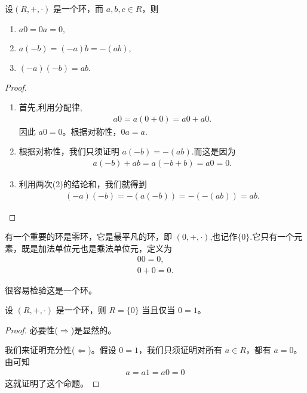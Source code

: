 \documentclass[../../main.tex]{subfiles}
\begin{document}
\begin{proposition}\label{proposition:环的加法单位元和乘法逆元的性质}
设$(R, +, \cdot)$ 是一个环，而 $a,b,c\in R$，则
\begin{enumerate}[(1)]
\item $a0 = 0a = 0,$

\item $a(-b)=(-a)b=-(ab),$

\item $(-a)(-b)=ab.$
\end{enumerate}
\end{proposition}
\begin{proof}
\begin{enumerate}[(1)]
\item 首先,利用分配律,
\begin{align*}
a0 = a(0 + 0)=a0 + a0.
\end{align*}
因此 $a0 = 0$。根据对称性，$0a = a$.

\item 根据对称性，我们只须证明 $a(-b)=-(ab)$.而这是因为
\begin{align*}
a(-b)+ab = a(-b + b)=a0 = 0.
\end{align*}

\item 利用两次(2)的结论和，我们就得到
\begin{align*}
(-a)(-b)=-(a(-b))=-(-(ab)) = ab.
\end{align*} 
\end{enumerate}

\end{proof}

\begin{definition}[零环]
有一个重要的环是零环，它是最平凡的环，即 $(0, +, \cdot)$,也记作$\{0\}$.它只有一个元素，既是加法单位元也是乘法单位元，定义为
\begin{gather*}
00 = 0 ,\\
0 + 0 = 0 .
\end{gather*} 
\end{definition}
\begin{note}
很容易检验这是一个环。
\end{note}

\begin{proposition}[零环的充要条件]\label{proposition:零环的充要条件}
设 $(R, +, \cdot)$ 是一个环，则 $R = \{0\}$ 当且仅当 $0 = 1$。
\end{proposition}
\begin{proof}
必要性($\Rightarrow$)是显然的。

我们来证明充分性($\Leftarrow$)。假设 $0 = 1$，我们只须证明对所有 $a \in R$，都有 $a = 0$。由可知
\begin{align*}
a = a1 = a0 = 0
\end{align*}
这就证明了这个命题。 

\end{proof}
\end{document}
